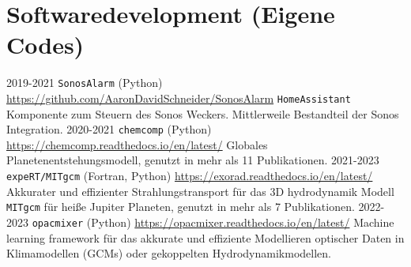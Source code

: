 \documentclass[]{friggeri-cv}
\begin{document}
\section{Softwaredevelopment (Eigene Codes)}
\begin{entrylist}
  \entry
    {2019-2021}
    {\texttt{SonosAlarm} (Python)}
    {\href{https://github.com/AaronDavidSchneider/SonosAlarm}{https://github.com/AaronDavidSchneider/SonosAlarm}}
    {\texttt{HomeAssistant} Komponente zum Steuern des Sonos Weckers. Mittlerweile Bestandteil der Sonos Integration.}   
  \entry
    {2020-2021}
    {\texttt{chemcomp} (Python)}
    {\href{https://chemcomp.readthedocs.io/en/latest/}{https://chemcomp.readthedocs.io/en/latest/}}
    {Globales Planetenentstehungsmodell, genutzt in mehr als 11 Publikationen.}    
  \entry
    {2021-2023}
    {\texttt{expeRT/MITgcm} (Fortran, Python)}
    {\href{https://exorad.readthedocs.io/en/latest/}{https://exorad.readthedocs.io/en/latest/}}
    {Akkurater und effizienter Strahlungstransport für das 3D hydrodynamik Modell \texttt{MITgcm}  für heiße Jupiter Planeten, genutzt in mehr als 7 Publikationen.}   
  \entry
    {2022-2023}
    {\texttt{opacmixer} (Python)}
    {\href{https://opacmixer.readthedocs.io/en/latest/}{https://opacmixer.readthedocs.io/en/latest/}}
    {Machine learning framework für das akkurate und effiziente Modellieren optischer Daten in Klimamodellen (GCMs) oder gekoppelten Hydrodynamikmodellen.}      
\end{entrylist}

\newpage
\end{document}
